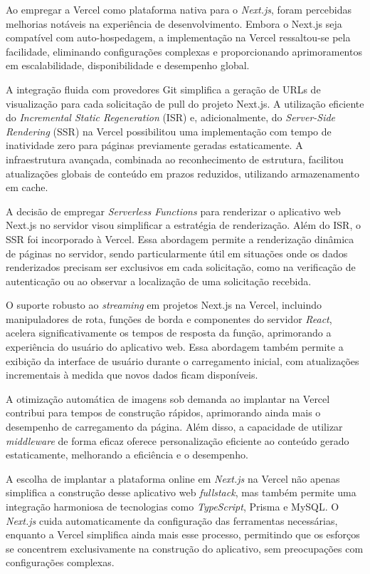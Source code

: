 Ao empregar a Vercel como plataforma nativa para o \textit{Next.js}, foram percebidas melhorias notáveis na experiência de desenvolvimento. Embora o Next.js seja compatível com auto-hospedagem, a implementação na Vercel ressaltou-se pela facilidade, eliminando configurações complexas e proporcionando aprimoramentos em escalabilidade, disponibilidade e desempenho global.

A integração fluida com provedores Git simplifica a geração de URLs de visualização para cada solicitação de pull do projeto Next.js. A utilização eficiente do \textit{Incremental Static Regeneration} (ISR) e, adicionalmente, do \textit{Server-Side Rendering} (SSR) na Vercel possibilitou uma implementação com tempo de inatividade zero para páginas previamente geradas estaticamente. A infraestrutura avançada, combinada ao reconhecimento de estrutura, facilitou atualizações globais de conteúdo em prazos reduzidos, utilizando armazenamento em cache.

A decisão de empregar \textit{Serverless Functions} para renderizar o aplicativo web Next.js no servidor visou simplificar a estratégia de renderização. Além do ISR, o SSR foi incorporado à Vercel. Essa abordagem permite a renderização dinâmica de páginas no servidor, sendo particularmente útil em situações onde os dados renderizados precisam ser exclusivos em cada solicitação, como na verificação de autenticação ou ao observar a localização de uma solicitação recebida.

O suporte robusto ao \textit{streaming} em projetos Next.js na Vercel, incluindo manipuladores de rota, funções de borda e componentes do servidor \textit{React}, acelera significativamente os tempos de resposta da função, aprimorando a experiência do usuário do aplicativo web. Essa abordagem também permite a exibição da interface de usuário durante o carregamento inicial, com atualizações incrementais à medida que novos dados ficam disponíveis.

A otimização automática de imagens sob demanda ao implantar na Vercel contribui para tempos de construção rápidos, aprimorando ainda mais o desempenho de carregamento da página. Além disso, a capacidade de utilizar \textit{middleware} de forma eficaz oferece personalização eficiente ao conteúdo gerado estaticamente, melhorando a eficiência e o desempenho.

A escolha de implantar a plataforma online em \textit{Next.js} na Vercel não apenas simplifica a construção desse aplicativo web \textit{fullstack}, mas também permite uma integração harmoniosa de tecnologias como \textit{TypeScript}, Prisma e MySQL. O \textit{Next.js} cuida automaticamente da configuração das ferramentas necessárias, enquanto a Vercel simplifica ainda mais esse processo, permitindo que os esforços se concentrem exclusivamente na construção do aplicativo, sem preocupações com configurações complexas.


